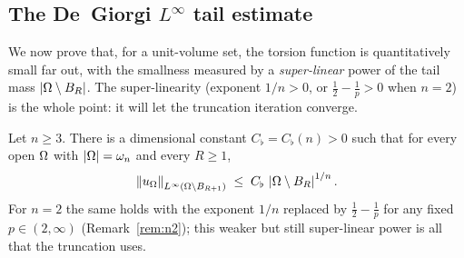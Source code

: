 \subsection{The De~Giorgi \texorpdfstring{$L^\infty$}{L-infinity} tail
estimate}\label{ssec:Linfty}

We now prove that, for a unit-volume set, the torsion function is
quantitatively small far out, with the smallness measured by a
\emph{super-linear} power of the tail mass $\left|\Omega\setminus B_R\right|$. The
super-linearity (exponent $1/n>0$, or $\tfrac12-\tfrac1p>0$ when $n=2$)
is the whole point: it will let the truncation iteration converge.

\begin{lemma}\label{lem:Linfty}
Let $n\ge3$. There is a dimensional constant $C_\flat=C_\flat(n)>0$ such
that for every open $\Omega$ with $\left|\Omega\right|=\omega_n$ and every $R\ge1$,
\begin{equation}\label{eq:Linfty}
   \left\|u_\Omega\right\|_{L^\infty(\Omega\setminus B_{R+1})}
   \;\le\;C_\flat\,\left|\Omega\setminus B_R\right|^{1/n}.
\end{equation}
For $n=2$ the same holds with the exponent $1/n$ replaced by
$\tfrac12-\tfrac1p$ for any fixed $p\in(2,\infty)$
(Remark~\textup{\ref{rem:n2}}); this weaker but still super-linear power is
all that the truncation uses.
\end{lemma}

